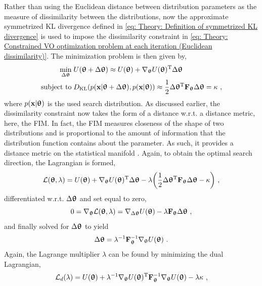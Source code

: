 Rather than using the Euclidean distance between distribution parameters as the measure of dissimilarity between the distributions, now the approximate symmetrized \gls{KL} divergence defined in \eqref{eq: Theory: Definition of symmetrized KL divergence} is used to impose the dissimilarity constraint in \eqref{eq: Theory: Constrained VO optimization problem at each iteration (Euclidean dissimilarity)}. The minimization problem is then given by,
\begin{equation}\label{eq: Theory: Constrained VO optimization problem at each iteration (KL divergence dissimilarity)}
    \begin{aligned}
        \min_{\Delta{\boldsymbol{\uptheta}}} &\; U({\boldsymbol{\uptheta}}+\Delta{\boldsymbol{\uptheta}}) \approx U({\boldsymbol{\uptheta}}) + \nabla_{\boldsymbol{\uptheta}} U({\boldsymbol{\uptheta}}){^\mathrm{T}}\Delta{\boldsymbol{\uptheta}}\\
        \text{subject to} &\; D_\text{KL}{\left(p({\mathbf{x}}|{\boldsymbol{\uptheta}}+\Delta{\boldsymbol{\uptheta}}), p({\mathbf{x}}|{\boldsymbol{\uptheta}})\right)} \approx \frac{1}{2}\Delta{\boldsymbol{\uptheta}}{^\mathrm{T}}{\mathbf{F}}_{\boldsymbol{\uptheta}}\Delta{\boldsymbol{\uptheta}} = \kappa \ ,
    \end{aligned}
\end{equation}
where $p({\mathbf{x}}|{\boldsymbol{\uptheta}})$ is the used search distribution.
As discussed earlier, the dissimilarity constraint now takes the form of a distance w.r.t. a distance metric, here, the \gls{FIM}. In fact, the \gls{FIM} measures closeness of the shape of two distributions and is proportional to the amount of information that the distribution function contains about the parameter. As such, it provides a distance metric on the statistical manifold \cite{Suzuki2014}.
Again, to obtain the optimal search direction, the Lagrangian is formed,
\begin{equation}
    \mathcal{L}({\boldsymbol{\uptheta}},\lambda) = U({\boldsymbol{\uptheta}}) + \nabla_{\boldsymbol{\uptheta}} U({\boldsymbol{\uptheta}}){^\mathrm{T}}\Delta{\boldsymbol{\uptheta}} - \lambda{\left(\frac{1}{2}\Delta{\boldsymbol{\uptheta}}{^\mathrm{T}}{\mathbf{F}}_{\boldsymbol{\uptheta}}\Delta{\boldsymbol{\uptheta}}- \kappa\right)} \ ,
\end{equation}
differentiated w.r.t. $\Delta{\boldsymbol{\uptheta}}$ and set equal to zero,
\begin{equation}
    0 = \nabla_\thetab\mathcal{L}(\thetab,\lambda) = \nabla_{\Delta\thetab} U(\thetab) - \lambda\F_\thetab\Delta\thetab \ ,
\end{equation}
and finally solved for $\Delta{\boldsymbol{\uptheta}}$ to yield
\begin{equation}
    \Delta{\boldsymbol{\uptheta}} = \lambda^{-1}{\mathbf{F}}_{\boldsymbol{\uptheta}}^{-1}\nabla_{\boldsymbol{\uptheta}} U({\boldsymbol{\uptheta}}) \ .
\end{equation}
Again, the Lagrange multiplier $\lambda$ can be found by minimizing the dual Lagrangian,
\begin{equation}
    \mathcal{L}_d(\lambda) = U({\boldsymbol{\uptheta}}) + \lambda^{-1} \nabla_{\boldsymbol{\uptheta}} U({\boldsymbol{\uptheta}}){^\mathrm{T}}{\mathbf{F}}_{\boldsymbol{\uptheta}}^{-1}\nabla_{\boldsymbol{\uptheta}} U({\boldsymbol{\uptheta}}) - \lambda\kappa \ ,
\end{equation}
